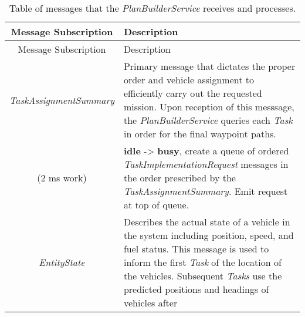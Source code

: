 \begin{longtable}[]{@{}cl@{}}
\caption{Table of messages that the \emph{PlanBuilderService} receives
and processes.}\tabularnewline
\toprule
\begin{minipage}[b]{0.40\columnwidth}\centering\strut
Message Subscription\strut
\end{minipage} & \begin{minipage}[b]{0.55\columnwidth}\raggedright\strut
Description\strut
\end{minipage}\tabularnewline
\midrule
\endfirsthead
\toprule
\begin{minipage}[b]{0.40\columnwidth}\centering\strut
Message Subscription\strut
\end{minipage} & \begin{minipage}[b]{0.55\columnwidth}\raggedright\strut
Description\strut
\end{minipage}\tabularnewline
\midrule
\endhead
\begin{minipage}[t]{0.40\columnwidth}\centering\strut
\emph{TaskAssignmentSummary}\strut
\end{minipage} & \begin{minipage}[t]{0.55\columnwidth}\raggedright\strut
Primary message that dictates the proper order and vehicle assignment to
efficiently carry out the requested mission. Upon reception of this
messsage, the \emph{PlanBuilderService} queries each \emph{Task} in
order for the final waypoint paths.\strut
\end{minipage}\tabularnewline
\begin{minipage}[t]{0.40\columnwidth}\centering\strut
(2 ms work)\strut
\end{minipage} & \begin{minipage}[t]{0.55\columnwidth}\raggedright\strut
\textbf{idle} -\textgreater{} \textbf{busy}, create a queue of ordered
\emph{TaskImplementationRequest} messages in the order prescribed by the
\emph{TaskAssignmentSummary}. Emit request at top of queue.\strut
\end{minipage}\tabularnewline
\begin{minipage}[t]{0.40\columnwidth}\centering\strut
\emph{EntityState}\strut
\end{minipage} & \begin{minipage}[t]{0.55\columnwidth}\raggedright\strut
Describes the actual state of a vehicle in the system including
position, speed, and fuel status. This message is used to inform the
first \emph{Task} of the location of the vehicles. Subsequent
\emph{Tasks} use the predicted positions and headings of vehicles after

\end{minipage}
\end{longtable}
